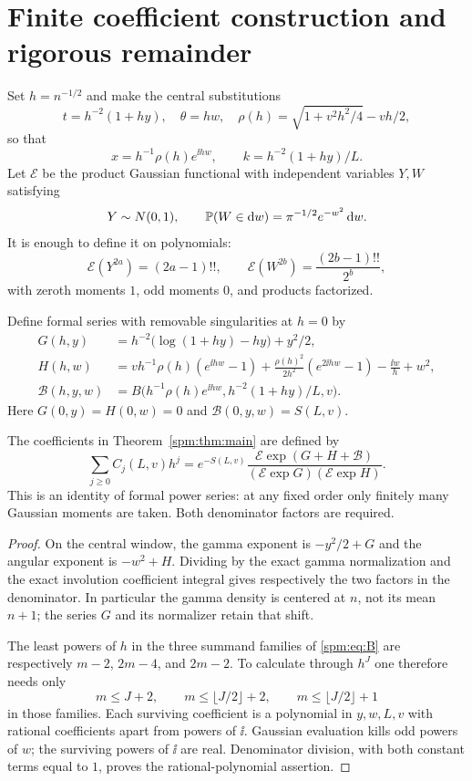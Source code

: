 \section{Finite coefficient construction and rigorous remainder}\label{spm:sec:allorders}
Set $h=n^{-1/2}$ and make the central substitutions
\begin{equation}\label{spm:eq:scaling}
 t=h^{-2}(1+hy),\quad \theta=hw,\quad
 \rho(h)=\sqrt{1+v^2h^2/4}-vh/2,
\end{equation}
so that
\[
 x=h^{-1}\rho(h)e^{\ii hw},\qquad
 k=h^{-2}(1+hy)/L.
\]
Let $\mathcal E$ be the product Gaussian functional with independent variables $Y,W$ satisfying
\[
 Y\sim N(0,1),\qquad
 \mathbb P(W\in\mathrm d w)=\pi^{-1/2}e^{-w^2}\,\mathrm d w.
\]
It is enough to define it on polynomials:
\[
 \mathcal E(Y^{2a})=(2a-1)!!,\qquad
 \mathcal E(W^{2b})=\frac{(2b-1)!!}{2^b},
\]
with zeroth moments $1$, odd moments $0$, and products factorized.

Define formal series with removable singularities at $h=0$ by
\begin{align}
 G(h,y)&=h^{-2}\bigl(\log(1+hy)-hy\bigr)+y^2/2,\label{spm:eq:G}\\
 H(h,w)&=v h^{-1}\rho(h)(e^{\ii hw}-1)
 +\frac{\rho(h)^2}{2h^2}(e^{2\ii hw}-1)-\frac{\ii w}{h}+w^2,\label{spm:eq:H}\\
 \mathcal B(h,y,w)&=B\bigl(h^{-1}\rho(h)e^{\ii hw},
                       h^{-2}(1+hy)/L,v\bigr).\label{spm:eq:scaledB}
\end{align}
Here $G(0,y)=H(0,w)=0$ and $\mathcal B(0,y,w)=S(L,v)$.

\begin{proposition}\label{spm:prop:algorithm}
The coefficients in Theorem~\ref{spm:thm:main} are defined by
\begin{equation}\label{spm:eq:algorithm}
 \sum_{j\geq0}C_j(L,v)h^j
 =e^{-S(L,v)}
 \frac{\mathcal E\exp(G+H+\mathcal B)}
      {(\mathcal E\exp G)(\mathcal E\exp H)}.
\end{equation}
This is an identity of formal power series: at any fixed order only finitely many Gaussian moments are taken. Both denominator factors are required.
\end{proposition}
\begin{proof}
On the central window, the gamma exponent is $-y^2/2+G$ and the angular exponent is $-w^2+H$. Dividing by the exact gamma normalization and the exact involution coefficient integral gives respectively the two factors in the denominator. In particular the gamma density is centered at $n$, not its mean $n+1$; the series $G$ and its normalizer retain that shift.

The least powers of $h$ in the three summand families of \eqref{spm:eq:B} are respectively $m-2$, $2m-4$, and $2m-2$. To calculate through $h^J$ one therefore needs only
\[
 m\leq J+2,\qquad m\leq\lfloor J/2\rfloor+2,
 \qquad m\leq\lfloor J/2\rfloor+1
\]
in those families. Each surviving coefficient is a polynomial in $y,w,L,v$ with rational coefficients apart from powers of $\ii$. Gaussian evaluation kills odd powers of $w$; the surviving powers of $\ii$ are real. Denominator division, with both constant terms equal to $1$, proves the rational-polynomial assertion.
\end{proof}

